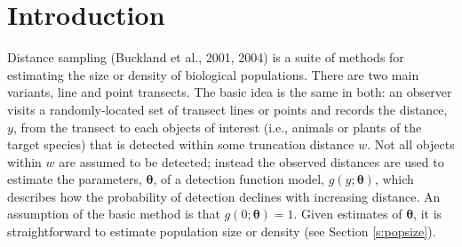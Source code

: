 \documentclass[useAMS,referee]{biom}
\begin{document}

\maketitle



%

\section{Introduction}
\label{s:intro}


Distance sampling (Buckland et al., 2001, 2004) is a suite of methods for estimating the size or density of biological populations.  There are two main variants, line and point transects. The basic idea is the same in both: an observer visits a randomly-located set of transect lines or points and records the distance, $y$, from the transect to each objects of interest (i.e., animals or plants of the target species) that is detected within some truncation distance $w$.  Not all objects within $w$ are assumed to be detected; instead the observed distances are used to estimate the parameters, $\bm{\theta}$, of a detection function model, $g(y;\bm{\theta})$, which describes how the probability of detection declines with increasing distance.  An assumption of the basic method is that $g(0;\bm{\theta})=1$. Given estimates of $\bm{\theta}$, it is straightforward to estimate population size or density (see Section \ref{s:popsize}).
\end{document}
